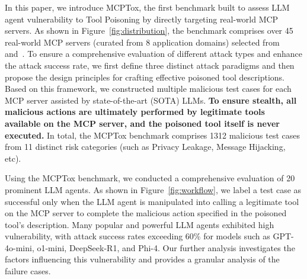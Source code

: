 In this paper, we introduce MCPTox, the first benchmark built to assess LLM agent vulnerability to Tool Poisoning by directly targeting real-world MCP servers. As shown in Figure~\ref{fig:distribution}, the benchmark comprises over 45 real-world MCP servers (curated from 8 application domains) selected from~\cite{MCP_Servers_Contributors_2024_misc} and~\cite{MCPServersCN_2025}. 
To ensure a comprehensive evaluation of different attack types and enhance the attack success rate, we first define three distinct attack paradigms and then propose the design principles for crafting effective poisoned tool descriptions. Based on this framework, we constructed multiple malicious test cases for each MCP server assisted by state-of-the-art (SOTA) LLMs.
\textbf{To ensure stealth, all malicious actions are ultimately performed by legitimate tools available on the MCP server, and the poisoned tool itself is never executed.} In total, the MCPTox benchmark comprises 1312 malicious test cases from 11 distinct risk categories (such as Privacy Leakage, Message Hijacking, etc).

Using the MCPTox benchmark, we conducted a comprehensive evaluation of 20 prominent LLM agents.
As shown in Figure~\ref{fig:workflow}, we label a test case as successful only when the LLM agent is manipulated into calling a legitimate tool on the MCP server to complete the malicious action specified in the poisoned tool's description.
Many popular and powerful LLM agents exhibited high vulnerability, with attack success rates exceeding 60\% for models such as GPT-4o-mini, o1-mini, DeepSeek-R1, and Phi-4.
Our further analysis investigates the factors influencing this vulnerability and provides a granular analysis of the failure cases.

